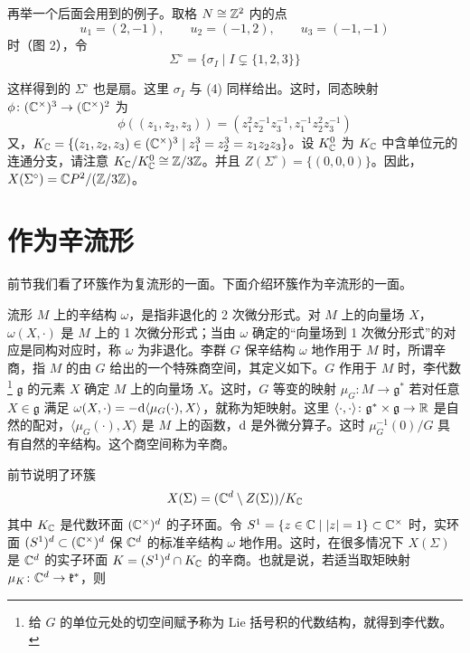 再举一个后面会用到的例子。取格 $N\cong\mathbb{Z}^2$ 内的点
\[
  u_1=(2,-1),\qquad u_2=(-1,2),\qquad u_3=(-1,-1)
\]
时（图 2），令
\begin{equation}
  \Sigma^\circ=\{\sigma_I\mid I\subsetneq\{1,2,3\}\} \tag{11}
\end{equation}

这样得到的 $\Sigma^\circ$ 也是扇。这里 $\sigma_I$ 与 (4) 同样给出。这时，同态映射 $\phi\colon(\mathbb{C}^\times)^3\to(\mathbb{C}^\times)^2$ 为
\begin{equation}
  \phi((z_1,z_2,z_3))=(z_1^2z_2^{-1}z_3^{-1},z_1^{-1}z_2^2z_3^{-1}) \tag{12}
\end{equation}
又，$K_{\mathbb{C}}=\{(z_1,z_2,z_3)\in(\mathbb{C}^\times)^3\mid z_1^3=z_2^3=z_1z_2z_3\}$。设 $K_{\mathbb{C}}^0$ 为 $K_{\mathbb{C}}$ 中含单位元的连通分支，请注意 $K_{\mathbb{C}}/K_{\mathbb{C}}^0\cong\mathbb{Z}/3\mathbb{Z}$。并且 $Z(\Sigma^\circ)=\{(0,0,0)\}$。因此，$X(\Sigma^\circ)=\mathbb{C}P^2/(\mathbb{Z}/3\mathbb{Z})$。


\section{作为辛流形}

前节我们看了环簇作为复流形的一面。下面介绍环簇作为辛流形的一面。

流形 $M$ 上的辛结构 $\omega$，是指非退化的 2 次微分形式。对 $M$ 上的向量场 $X$，$\omega(X,\cdot)$ 是 $M$ 上的 1 次微分形式；当由 $\omega$ 确定的“向量场到 1 次微分形式”的对应是同构对应时，称 $\omega$ 为非退化。李群 $G$ 保辛结构 $\omega$ 地作用于 $M$ 时，所谓辛商，指 $M$ 的由 $G$ 给出的一个特殊商空间，其定义如下。$G$ 作用于 $M$ 时，李代数\footnote{给 $G$ 的单位元处的切空间赋予称为 Lie 括号积的代数结构，就得到李代数。} $\mathfrak{g}$ 的元素 $X$ 确定 $M$ 上的向量场 $X$。这时，$G$ 等变的映射 $\mu_G\colon M\to\mathfrak{g}^*$ 若对任意 $X\in\mathfrak{g}$ 满足 $\omega(X,\cdot)=-\mathrm{d}\langle\mu_G(\cdot),X\rangle$，就称为矩映射。这里 $\langle\cdot,\cdot\rangle\colon\mathfrak{g}^*\times\mathfrak{g}\to\mathbb{R}$ 是自然的配对，$\langle\mu_G(\cdot),X\rangle$ 是 $M$ 上的函数，$\mathrm{d}$ 是外微分算子。这时 $\mu_G^{-1}(0)/G$ 具有自然的辛结构。这个商空间称为辛商。

前节说明了环簇
\[
  X(\Sigma)=(\mathbb{C}^d\setminus Z(\Sigma))/K_{\mathbb{C}}
\]
其中 $K_{\mathbb{C}}$ 是代数环面 $(\mathbb{C}^\times)^d$ 的子环面。令 $S^1=\{z\in\mathbb{C}\mid |z|=1\}\subset\mathbb{C}^\times$ 时，实环面 $(S^1)^d\subset(\mathbb{C}^\times)^d$ 保 $\mathbb{C}^d$ 的标准辛结构 $\omega$ 地作用。这时，在很多情况下 $X(\Sigma)$ 是 $\mathbb{C}^d$ 的实子环面 $K=(S^1)^d\cap K_{\mathbb{C}}$ 的辛商。也就是说，若适当取矩映射 $\mu_K\colon\mathbb{C}^d\to\mathfrak{k}^*$，则

